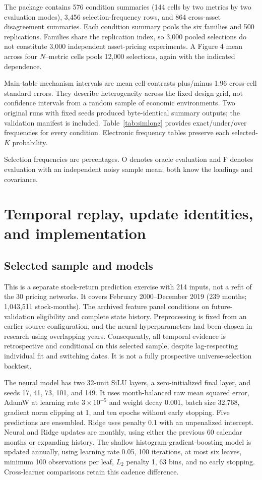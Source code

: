 \documentclass[11pt]{article}
\begin{document}
The package contains 576 condition summaries (144 cells by two metrics by two evaluation modes), 3,456 selection-frequency rows, and 864 cross-asset disagreement summaries. Each condition summary pools the six families and 500 replications. Families share the replication index, so 3,000 pooled selections do not constitute 3,000 independent asset-pricing experiments. A Figure 4 mean across four $N$--metric cells pools 12,000 selections, again with the indicated dependence.

Main-table mechanism intervals are mean cell contrasts plus/minus 1.96 cross-cell standard errors. They describe heterogeneity across the fixed design grid, not confidence intervals from a random sample of economic environments. Two original runs with fixed seeds produced byte-identical summary outputs; the validation manifest is included. Table~\ref{tab:simlong} provides exact/under/over frequencies for every condition. Electronic frequency tables preserve each selected-$K$ probability.

Selection frequencies are percentages. O denotes oracle evaluation and F denotes evaluation with an independent noisy sample mean; both know the loadings and covariance.\par


\section{Temporal replay, update identities, and implementation}
\setcounter{equation}{0}
\subsection{Selected sample and models}
This is a separate stock-return prediction exercise with 214 inputs, not a refit of the 30 pricing networks. It covers February 2000--December 2019 (239 months; 1,043,511 stock-months). The archived feature panel conditions on future-validation eligibility and complete state history. Preprocessing is fixed from an earlier source configuration, and the neural hyperparameters had been chosen in research using overlapping years. Consequently, all temporal evidence is retrospective and conditional on this selected sample, despite lag-respecting individual fit and switching dates. It is not a fully prospective universe-selection backtest.

The neural model has two 32-unit SiLU layers, a zero-initialized final layer, and seeds 17, 41, 73, 101, and 149. It uses month-balanced raw mean squared error, AdamW at learning rate $3\times10^{-5}$ and weight decay 0.001, batch size 32,768, gradient norm clipping at 1, and ten epochs without early stopping. Five predictions are ensembled. Ridge uses penalty 0.1 with an unpenalized intercept. Neural and Ridge updates are monthly, using either the previous 60 calendar months or expanding history. The shallow histogram-gradient-boosting model is updated annually, using learning rate 0.05, 100 iterations, at most six leaves, minimum 100 observations per leaf, $L_2$ penalty 1, 63 bins, and no early stopping. Cross-learner comparisons retain this cadence difference.
\end{document}
